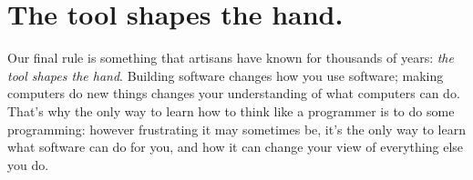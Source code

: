 \documentclass[10pt,letterpaper]{article}
\newcommand{\rulemajor}[1]{\section{#1}}
\begin{document}
\rulemajor{The tool shapes the hand.}

Our final rule is something that artisans have known for thousands of years:
\emph{the tool shapes the hand}.  Building software changes how you use
software; making computers do new things changes your understanding of what
computers can do.  That's why the only way to learn how to think like a
programmer is to do some programming: however frustrating it may sometimes be,
it's the only way to learn what software can do for you, and how it can change
your view of everything else you do.


\end{document}
